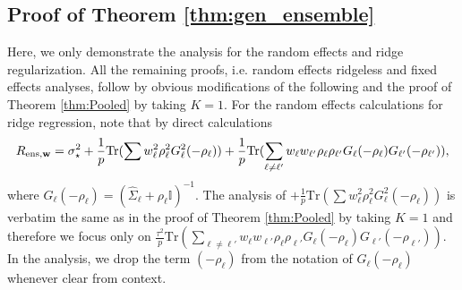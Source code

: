 \documentclass{article}
\theoremstyle{plain}
\theoremstyle{remark}
\def \tr {\mathrm{Tr}}
\def \I{\mathcal{I}}
\def \I {\mathbb{I}}
\begin{document}
\subsection{Proof of Theorem \ref{thm:gen_ensemble}}
Here, we only demonstrate the analysis for the random effects and ridge regularization. All the remaining proofs, i.e. random effects ridgeless and fixed effects analyses, follow by obvious modifications of the following and the proof of Theorem \ref{thm:Pooled} by taking $K=1$. 
For the random effects calculations for ridge regression, note that by direct calculations
\begin{align*}
    R_{\rm ens, \mathbf{w}}=\sigma_\star^2+\frac{1}{p}\tr(\sum w^2_{\ell}\rho^2_{\ell}G^2_{\ell}(-\rho_{\ell}))+\frac{1}{p}\tr(\sum_{\ell\neq \ell'} w_{\ell}w_{\ell'}\rho_{\ell}\rho_{\ell'}G_{\ell}(-\rho_{\ell})G_{\ell'}(-\rho_{\ell'})),
\end{align*}
where $G_{\ell}(-\rho_{\ell})=(\hat{\Sigma}_{\ell}+\rho_{\ell}\I)^{-1}$. The analysis of $+\frac{1}{p}\tr(\sum w^2_{\ell}\rho^2_{\ell}G^2_{\ell}(-\rho_{\ell}))$ is verbatim the same as in the proof of Theorem \ref{thm:Pooled} by taking $K=1$ and therefore we focus only on $\frac{\tau^2}{p}\tr(\sum_{\ell\neq \ell'} w_{\ell}w_{\ell'}\rho_{\ell}\rho_{\ell'}G_{\ell}(-\rho_{\ell})G_{\ell'}(-\rho_{\ell'}))$.
In the analysis, we drop the term $(-\rho_{\ell})$ from the notation of $G_{\ell}(-\rho_{\ell})$ whenever clear from context.
\end{document}

